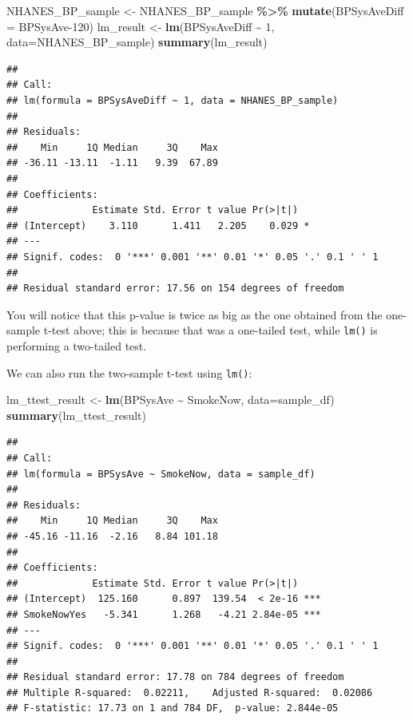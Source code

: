\documentclass[
  12pt,
]{book}
\newenvironment{Shaded}{\begin{snugshade}}{\end{snugshade}}
\newcommand{\AttributeTok}[1]{\textcolor[rgb]{0.13,0.29,0.53}{#1}}
\newcommand{\DecValTok}[1]{\textcolor[rgb]{0.00,0.00,0.81}{#1}}
\newcommand{\FunctionTok}[1]{\textcolor[rgb]{0.13,0.29,0.53}{\textbf{#1}}}
\newcommand{\NormalTok}[1]{#1}
\newcommand{\OtherTok}[1]{\textcolor[rgb]{0.56,0.35,0.01}{#1}}
\newcommand{\SpecialCharTok}[1]{\textcolor[rgb]{0.81,0.36,0.00}{\textbf{#1}}}
\begin{document}
\begin{Shaded}
\begin{Highlighting}[]
\NormalTok{NHANES\_BP\_sample }\OtherTok{\textless{}{-}}\NormalTok{ NHANES\_BP\_sample }\SpecialCharTok{\%\textgreater{}\%}
  \FunctionTok{mutate}\NormalTok{(}\AttributeTok{BPSysAveDiff =}\NormalTok{ BPSysAve}\DecValTok{{-}120}\NormalTok{)}
\NormalTok{lm\_result }\OtherTok{\textless{}{-}} \FunctionTok{lm}\NormalTok{(BPSysAveDiff }\SpecialCharTok{\textasciitilde{}} \DecValTok{1}\NormalTok{, }\AttributeTok{data=}\NormalTok{NHANES\_BP\_sample)}
\FunctionTok{summary}\NormalTok{(lm\_result)}
\end{Highlighting}
\end{Shaded}

\begin{verbatim}
## 
## Call:
## lm(formula = BPSysAveDiff ~ 1, data = NHANES_BP_sample)
## 
## Residuals:
##    Min     1Q Median     3Q    Max 
## -36.11 -13.11  -1.11   9.39  67.89 
## 
## Coefficients:
##             Estimate Std. Error t value Pr(>|t|)  
## (Intercept)    3.110      1.411   2.205    0.029 *
## ---
## Signif. codes:  0 '***' 0.001 '**' 0.01 '*' 0.05 '.' 0.1 ' ' 1
## 
## Residual standard error: 17.56 on 154 degrees of freedom
\end{verbatim}

You will notice that this p-value is twice as big as the one obtained from the one-sample t-test above; this is because that was a one-tailed test, while \texttt{lm()} is performing a two-tailed test.

We can also run the two-sample t-test using \texttt{lm()}:

\begin{Shaded}
\begin{Highlighting}[]
\NormalTok{lm\_ttest\_result }\OtherTok{\textless{}{-}} \FunctionTok{lm}\NormalTok{(BPSysAve }\SpecialCharTok{\textasciitilde{}}\NormalTok{ SmokeNow, }\AttributeTok{data=}\NormalTok{sample\_df)}
\FunctionTok{summary}\NormalTok{(lm\_ttest\_result)}
\end{Highlighting}
\end{Shaded}

\begin{verbatim}
## 
## Call:
## lm(formula = BPSysAve ~ SmokeNow, data = sample_df)
## 
## Residuals:
##    Min     1Q Median     3Q    Max 
## -45.16 -11.16  -2.16   8.84 101.18 
## 
## Coefficients:
##             Estimate Std. Error t value Pr(>|t|)    
## (Intercept)  125.160      0.897  139.54  < 2e-16 ***
## SmokeNowYes   -5.341      1.268   -4.21 2.84e-05 ***
## ---
## Signif. codes:  0 '***' 0.001 '**' 0.01 '*' 0.05 '.' 0.1 ' ' 1
## 
## Residual standard error: 17.78 on 784 degrees of freedom
## Multiple R-squared:  0.02211,    Adjusted R-squared:  0.02086 
## F-statistic: 17.73 on 1 and 784 DF,  p-value: 2.844e-05
\end{verbatim}
\end{document}
